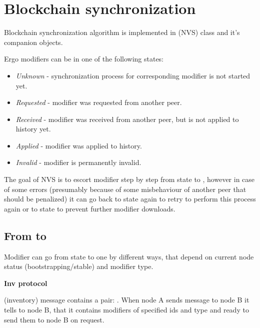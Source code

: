 
\section{Blockchain synchronization}

Blockchain synchronization algorithm is implemented in (NVS) class and it's companion objects.


Ergo modifiers can be in one of the following states:

\begin{itemize}
    \item{\em Unknown} - synchronization process for corresponding modifier is not started yet.
    \item{\em Requested} - modifier was requested from another peer.
    \item{\em Received} - modifier was received from another peer, but is not applied to history yet.
    \item{\em Applied} - modifier was applied to history.
    \item{\em Invalid} - modifier is permanently invalid.
\end{itemize}

The goal of NVS is to escort modifier step by step from  state to ,
however in case of some errors (presumably because of some misbehaviour of another
peer that should be penalized) it can go back to  state again to retry to
perform this process again or to  state to prevent further modifier downloads.

\subsection{From  to }

Modifier can go from  state to  one by different ways, that depend on
current node status (bootstrapping/stable) and modifier type.

\textbf{Inv protocol}

 (inventory) message contains a pair: . When node A sends  message
to node B it tells to node B, that it contains modifiers of specified ids and type and ready to send them to
node B on request.

